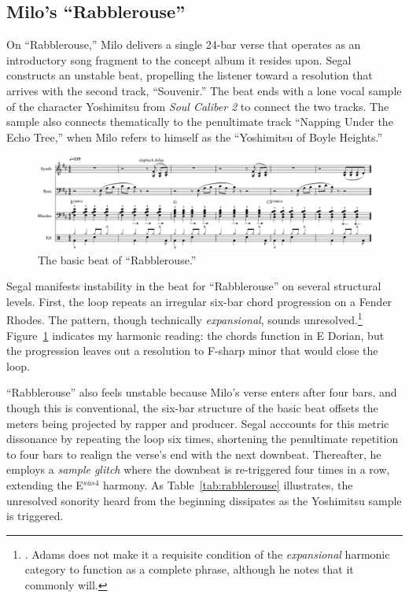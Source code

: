 \subsection*{\centering Milo's ``Rabblerouse''}

On ``Rabblerouse,'' Milo delivers a single 24-bar verse that operates as an introductory song fragment to the concept album it resides upon. Segal constructs an unstable beat, propelling the listener toward a resolution that arrives with the second track, ``Souvenir.'' The beat ends with a lone vocal sample of the character Yoshimitsu from \textit{Soul Caliber 2} to connect the two tracks. The sample also connects thematically to the penultimate track ``Napping Under the Echo Tree,'' when Milo refers to himself as the ``Yoshimitsu of Boyle Heights.''

    \begin{figure}[ht]
        \centering
        \includegraphics[width=\textwidth]{images/figures/chp 02/Figure-02.4-Rabblerouse-BB.pdf}
        \caption{The basic beat of ``Rabblerouse.''}
        \label{fig:3.1}
    \end{figure}

Segal manifests instability in the beat for ``Rabblerouse'' on several structural levels. First, the loop repeats an irregular six-bar chord progression on a Fender Rhodes. The pattern, though technically \emph{expansional}, sounds unresolved.\footnote{\cite{kyleadamsHarmonicSyntacticMotivic2020}. Adams does not make it a requisite condition of the \emph{expansional} harmonic category to function as a complete phrase, although he notes that it commonly will.} Figure~\ref{fig:3.1} indicates my harmonic reading: the chords function in E Dorian, but the progression leaves out a resolution to F-sharp minor that would close the loop.

``Rabblerouse'' also feels unstable because Milo's verse enters after four bars, and though this is conventional, the six-bar structure of the basic beat offsets the meters being projected by rapper and producer. Segal acccounts for this metric dissonance by repeating the loop six times, shortening the penultimate repetition to four bars to realign the verse's end with the next downbeat. Thereafter, he employs a \emph{sample glitch} where the downbeat is re-triggered four times in a row, extending the E$^{sus4}$ harmony. As Table~\ref{tab:rabblerouse} illustrates, the unresolved sonority heard from the beginning dissipates as the Yoshimitsu sample is triggered.



